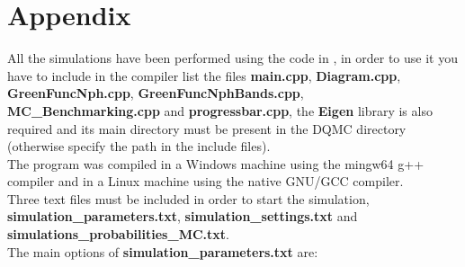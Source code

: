 \section*{Appendix}
All the simulations have been performed using the code in \cite{github_repo}, in order to use it you have to 
include in the compiler list the files \textbf{main.cpp}, \textbf{Diagram.cpp}, \textbf{GreenFuncNph.cpp}, \textbf{GreenFuncNphBands.cpp}, 
\textbf{MC\_Benchmarking.cpp} and \textbf{progressbar.cpp}, the \textbf{Eigen} library is also required and its main directory must be present in the DQMC directory (otherwise specify the path in the include files).\\ 
The program was compiled in a Windows machine using the mingw64 g++ compiler and in a Linux machine using the native GNU/GCC compiler.\\
Three text files must be included in order to start the simulation, \textbf{simulation\_parameters.txt}, \textbf{simulation\_settings.txt} and 
\textbf{simulations\_probabilities\_MC.txt}.\\
The main options of \textbf{simulation\_parameters.txt} are:
